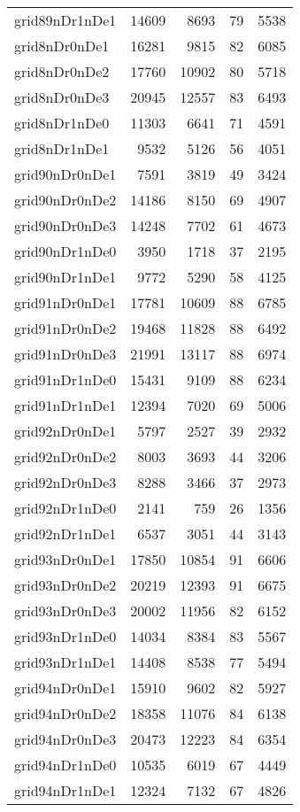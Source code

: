 \begin{longtable}{lrrrr}
grid89nDr1nDe1 & 14609 & 8693 & 79 & 5538 \\
grid8nDr0nDe1 & 16281 & 9815 & 82 & 6085 \\
grid8nDr0nDe2 & 17760 & 10902 & 80 & 5718 \\
grid8nDr0nDe3 & 20945 & 12557 & 83 & 6493 \\
grid8nDr1nDe0 & 11303 & 6641 & 71 & 4591 \\
grid8nDr1nDe1 & 9532 & 5126 & 56 & 4051 \\
grid90nDr0nDe1 & 7591 & 3819 & 49 & 3424 \\
grid90nDr0nDe2 & 14186 & 8150 & 69 & 4907 \\
grid90nDr0nDe3 & 14248 & 7702 & 61 & 4673 \\
grid90nDr1nDe0 & 3950 & 1718 & 37 & 2195 \\
grid90nDr1nDe1 & 9772 & 5290 & 58 & 4125 \\
grid91nDr0nDe1 & 17781 & 10609 & 88 & 6785 \\
grid91nDr0nDe2 & 19468 & 11828 & 88 & 6492 \\
grid91nDr0nDe3 & 21991 & 13117 & 88 & 6974 \\
grid91nDr1nDe0 & 15431 & 9109 & 88 & 6234 \\
grid91nDr1nDe1 & 12394 & 7020 & 69 & 5006 \\
grid92nDr0nDe1 & 5797 & 2527 & 39 & 2932 \\
grid92nDr0nDe2 & 8003 & 3693 & 44 & 3206 \\
grid92nDr0nDe3 & 8288 & 3466 & 37 & 2973 \\
grid92nDr1nDe0 & 2141 & 759 & 26 & 1356 \\
grid92nDr1nDe1 & 6537 & 3051 & 44 & 3143 \\
grid93nDr0nDe1 & 17850 & 10854 & 91 & 6606 \\
grid93nDr0nDe2 & 20219 & 12393 & 91 & 6675 \\
grid93nDr0nDe3 & 20002 & 11956 & 82 & 6152 \\
grid93nDr1nDe0 & 14034 & 8384 & 83 & 5567 \\
grid93nDr1nDe1 & 14408 & 8538 & 77 & 5494 \\
grid94nDr0nDe1 & 15910 & 9602 & 82 & 5927 \\
grid94nDr0nDe2 & 18358 & 11076 & 84 & 6138 \\
grid94nDr0nDe3 & 20473 & 12223 & 84 & 6354 \\
grid94nDr1nDe0 & 10535 & 6019 & 67 & 4449 \\
grid94nDr1nDe1 & 12324 & 7132 & 67 & 4826 \\

\end{longtable}
